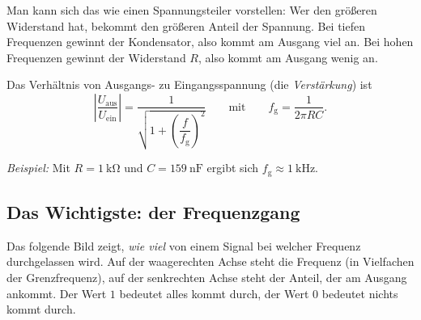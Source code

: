\documentclass[a4paper,12pt,twoside]{report}
\theoremstyle{definition}
\begin{document}
Man kann sich das wie einen Spannungsteiler vorstellen: Wer den
größeren Widerstand hat, bekommt den größeren Anteil der Spannung. Bei
tiefen Frequenzen \glqq gewinnt\grqq{} der Kondensator, also kommt am
Ausgang viel an. Bei hohen Frequenzen \glqq gewinnt\grqq{} der
Widerstand $R$, also kommt am Ausgang wenig an.

Das Verhältnis von Ausgangs- zu Eingangsspannung (die
\emph{Verstärkung}) ist
\begin{equation}
  \left|\frac{U_\mathrm{aus}}{U_\mathrm{ein}}\right|
  = \frac{1}{\sqrt{1+\left(\dfrac{f}{f_\mathrm{g}}\right)^{2}}}
  \qquad\text{mit}\qquad
  f_\mathrm{g} = \frac{1}{2\pi R C}.
\end{equation}

\emph{Beispiel:} Mit $R = \SI{1}{\kilo\ohm}$ und $C = \SI{159}{\nano\farad}$
ergibt sich $f_\mathrm{g} \approx \SI{1}{\kilo\hertz}$.

\subsection*{Das Wichtigste: der Frequenzgang}

Das folgende Bild zeigt, \emph{wie viel} von einem Signal bei welcher
Frequenz durchgelassen wird. Auf der waagerechten Achse steht die
Frequenz (in Vielfachen der Grenzfrequenz), auf der senkrechten Achse
steht der Anteil, der am Ausgang ankommt. Der Wert $1$ bedeutet
\glqq alles kommt durch\grqq, der Wert $0$ bedeutet \glqq nichts kommt
durch\grqq.
\end{document}
